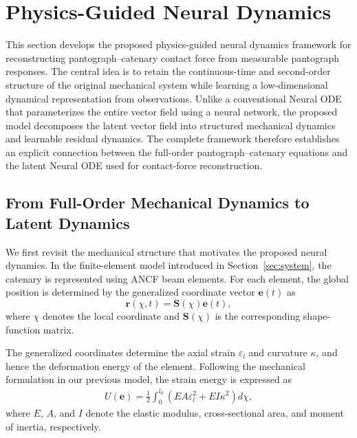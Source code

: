 \documentclass[journal,twoside]{IEEEtran}
\begin{document}
\section{Physics-Guided Neural Dynamics}
\label{sec:method}

This section develops the proposed physics-guided neural dynamics framework
for reconstructing pantograph--catenary contact force from measurable
pantograph responses. The central idea is to retain the continuous-time and
second-order structure of the original mechanical system while learning a
low-dimensional dynamical representation from observations. Unlike a
conventional Neural ODE that parameterizes the entire vector field using a
neural network, the proposed model decomposes the latent vector field into
structured mechanical dynamics and learnable residual dynamics. The complete
framework therefore establishes an explicit connection between the
full-order pantograph--catenary equations and the latent Neural ODE used for
contact-force reconstruction.

\subsection{From Full-Order Mechanical Dynamics to Latent Dynamics}
\label{subsec:mechanical_latent}

We first revisit the mechanical structure that motivates the proposed neural
dynamics. In the finite-element model introduced in
Section~\ref{sec:system}, the catenary is represented using ANCF beam
elements. For each element, the global position is determined by the
generalized coordinate vector $\mathbf{e}(t)$ as
\begin{equation}
    \mathbf{r}(\chi,t)
    =
    \mathbf{S}(\chi)\mathbf{e}(t),
    \label{eq:ancf_position}
\end{equation}
where $\chi$ denotes the local coordinate and $\mathbf{S}(\chi)$ is the
corresponding shape-function matrix.

The generalized coordinates determine the axial strain
$\varepsilon_l$ and curvature $\kappa$, and hence the deformation energy of
the element. Following the mechanical formulation in our previous model, the
strain energy is expressed as
\begin{equation}
\begin{aligned}
    U(\mathbf{e})
    =
    \frac{1}{2}
    \int_{0}^{l_0}
    \left(
        EA\varepsilon_l^2
        +
        EI\kappa^2
    \right)d\chi ,
\end{aligned}
\label{eq:strain_energy}
\end{equation}
where $E$, $A$, and $I$ denote the elastic modulus, cross-sectional area,
and moment of inertia, respectively.
\end{document}
